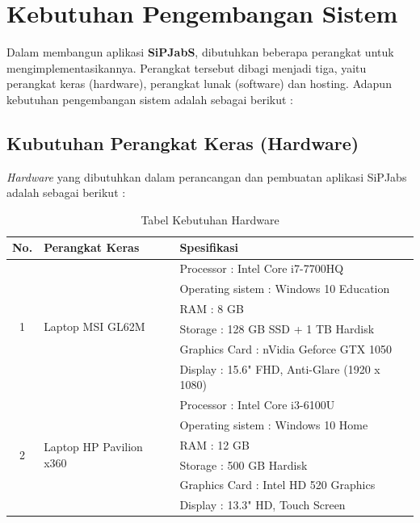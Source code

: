 \section{Kebutuhan Pengembangan Sistem}

Dalam membangun aplikasi \textbf{SiPJabS}, dibutuhkan beberapa perangkat untuk mengimplementasikannya. Perangkat tersebut dibagi menjadi tiga, yaitu perangkat keras (hardware), perangkat lunak (software) dan hosting. Adapun kebutuhan pengembangan sistem adalah sebagai berikut : 

\subsection{Kubutuhan Perangkat Keras (Hardware) }

\textit{Hardware} yang dibutuhkan dalam perancangan dan pembuatan aplikasi SiPJabs
adalah sebagai berikut :


\begin{table}[H]
	\centering
	\caption{Tabel Kebutuhan Hardware}
	\begin{tabular}{ | c | l | p{75mm} | }
		\hline
		No. & Perangkat Keras & Spesifikasi \\
		\hline
		\multirow{6}{*}{1} & \multirow{6}{*}{Laptop MSI GL62M} & Processor : Intel Core i7-7700HQ \\
		& & Operating sistem : Windows 10 Education \\
		& & RAM : 8 GB \\
		& & Storage : 128 GB SSD + 1 TB Hardisk \\
		& & Graphics Card :  nVidia Geforce GTX 1050 \\
		& & Display : 15.6" FHD, Anti-Glare (1920 x 1080) \\
		
		
		\hline
		
		\multirow{6}{*}{2} & \multirow{6}{*}{Laptop HP Pavilion x360} & Processor : Intel Core i3-6100U \\
		& & Operating sistem : Windows 10 Home \\
		& & RAM : 12 GB \\
		& & Storage : 500 GB Hardisk\\
		& & Graphics Card : Intel HD 520 Graphics \\
		& & Display : 13.3" HD, Touch Screen \\
		
		\hline
	\end{tabular}
\end{table}


